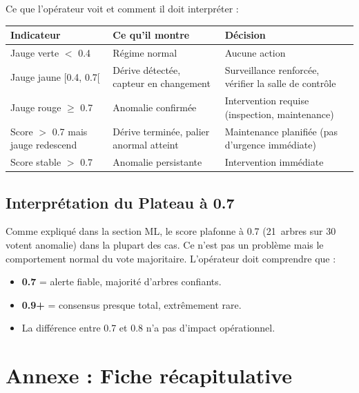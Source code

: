 \documentclass[11pt,a4paper]{article}
\begin{document}
Ce que l'opérateur voit et comment il doit interpréter :

\begin{center}
\small
\begin{tabularx}{\textwidth}{|X|X|X|}
\hline
\textbf{Indicateur} & \textbf{Ce qu'il montre} & \textbf{Décision} \\
\hline
Jauge verte $<$ 0.4 & Régime normal & Aucune action \\
Jauge jaune [0.4, 0.7[ & Dérive détectée, capteur en changement & Surveillance renforcée, vérifier la salle de contrôle \\
Jauge rouge $\geq$ 0.7 & Anomalie confirmée & Intervention requise (inspection, maintenance) \\
Score $>$ 0.7 mais jauge redescend & Dérive terminée, palier anormal atteint & Maintenance planifiée (pas d'urgence immédiate) \\
Score stable $>$ 0.7 & Anomalie persistante & Intervention immédiate \\
\hline
\end{tabularx}
\end{center}

\subsection{Interprétation du Plateau à 0.7}

Comme expliqué dans la section ML, le score plafonne à 0.7 (21~arbres sur 30 votent anomalie) dans la plupart des cas. Ce n'est pas un problème mais le comportement normal du vote majoritaire. L'opérateur doit comprendre que :

\begin{itemize}
    \item \textbf{0.7} = alerte fiable, majorité d'arbres confiants.
    \item \textbf{0.9+} = consensus presque total, extrêmement rare.
    \item La différence entre 0.7 et 0.8 n'a pas d'impact opérationnel.
\end{itemize}

\newpage

\section*{Annexe : Fiche récapitulative}
\end{document}
